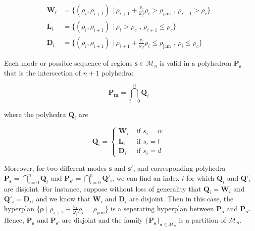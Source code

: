 \begin{equation}
\begin{array}{ll}
\textbf{W}_{i} & = \{(\rho_{i},\rho_{i+1}) \mid \rho_{i+1} + \frac{v_{f}}{\omega_{f}}\rho_{i} > \rho_{\text{jam}} \text{ ,   } \rho_{i+1} > \rho_{c}\}\\
\textbf{L}_{i} & = \{(\rho_{i},\rho_{i+1}) \mid \rho_{i} > \rho_{c} \text{ ,   } \rho_{i+1} \leq \rho_{c}\}\\
\textbf{D}_{i} & = \{(\rho_{i},\rho_{i+1}) \mid \rho_{i+1} + \frac{v_{f}}{\omega_{f}}\rho_{i} \leq \rho_{\text{jam}} \text{ ,   } \rho_{i} \leq \rho_{c}\}
\end{array}
\label{eq:regions3}
\end{equation}

\noindent Each mode or possible sequence of regions $\boldsymbol s \in \mathcal{M}_{n}$ is valid in a polyhedron $\textbf{P}_{\boldsymbol s}$ that is the intersection of $n+1$ polyhedra:

\begin{equation}
\textbf{P}_{\boldsymbol m}=\bigcap_{i=0}^{n} \textbf{Q}_{i}
\label{eq:Hrepresentation}
\end{equation}

\noindent where the polyhedra $\textbf{Q}_{i}$ are

\begin{equation}
\textbf{Q}_{i}=
\begin{cases}
\textbf{W}_{i} & \text{ if } s_{i}=w\\
\textbf{L}_{i} & \text{ if } s_{i}=l\\
\textbf{D}_{i} & \text{ if } s_{i}=d
\end{cases}
\label{eq:Hrepresentation2}
\end{equation}


Moreover, for two different modes $\boldsymbol s$ and $\boldsymbol s'$, and corresponding polyhedra $\textbf{P}_{\boldsymbol s}=\bigcap_{i=0}^{n} \textbf{Q}_{i}$ and $\textbf{P}_{\boldsymbol s'}=\bigcap_{i=0}^{n} \textbf{Q}'_{i}$, we can find an index $i$ for which $\textbf{Q}_{i}$ and $\textbf{Q}'_{i}$ are disjoint. For instance, suppose without loss of generality that $\textbf{Q}_{i}=\textbf{W}_{i}$ and $\textbf{Q}'_{i}=\textbf{D}_{i}$, and we know that $\textbf{W}_{i}$ and $\textbf{D}_{i}$ are disjoint. Then in this case, the hyperplan $\{\boldsymbol \rho\mid\rho_{i+1} + \frac{v_{f}}{\omega_{f}}\rho_{i} = \rho_{\text{jam}}\}$ is a seperating hyperplan between $\textbf{P}_{\boldsymbol s}$ and $\textbf{P}_{\boldsymbol s'}$. Hence, $\textbf{P}_{\boldsymbol s}$ and $\textbf{P}_{\boldsymbol s'}$ are disjoint and the family $\{\textbf{P}_{\boldsymbol s}\}_{\boldsymbol s \in \mathcal{M}_{n}}$ is a partition of $\mathcal{M}_{n}$.